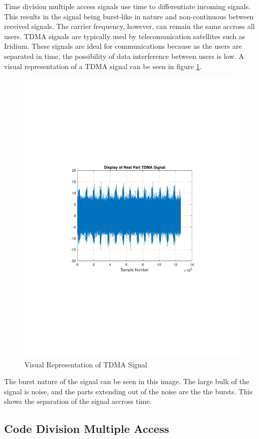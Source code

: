 \documentclass[12pt]{report}
\begin{document}
Time division multiple access signals use time to differentiate incoming signals. This results in the signal being burst-like in nature and non-continuous between received signals. The carrier frequency, however, can remain the same accross all users. TDMA signals are typically used by telecomunication satellites such as Iridium. These signals are ideal for communications because as the users are separated in time, the possibility of data interference between users is low. A visual representation of a TDMA signal can be seen in figure \ref{fig:TDMAVisual}.
\begin{figure}[h!]
    \centering
    \includegraphics[width=5in]{TDMA_signal}
    \caption{Visual Representation of TDMA Signal}
    \label{fig:TDMAVisual}
\end{figure}
The burst nature of the signal can be seen in this image. The large bulk of the signal is noise, and the parts extending out of the noise are the the bursts. This shows the separation of the signal accross time. 

\subsection{Code Division Multiple Access}
\end{document}
